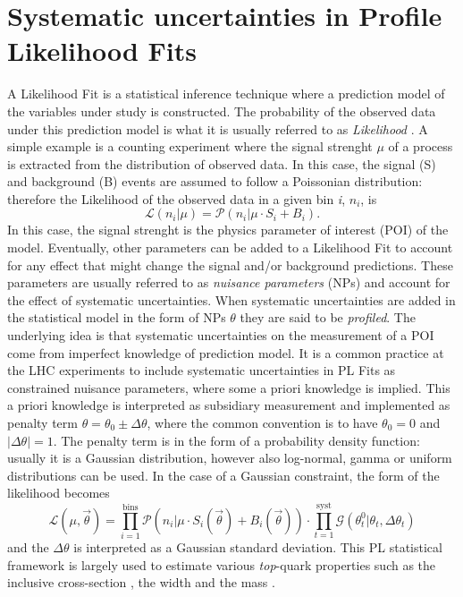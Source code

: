 \documentclass[12pt]{article}
\begin{document}
\section{Systematic uncertainties in Profile Likelihood Fits}
A Likelihood Fit is a statistical inference technique where a prediction model of the variables under study is constructed. The probability of the observed data under this prediction model is what it is usually referred to as \emph{Likelihood} \cite{kCranmer}.
A simple example is a counting experiment where the signal strenght $\mu$ of a process is extracted from the distribution of observed data. In this case, the signal (S) and background (B) events are assumed to follow a Poissonian distribution: therefore the Likelihood of the observed data in a given bin \emph{i}, $n_i$, is
\begin{equation}
\mathcal{L}(n_i|\mu) = \mathcal{P}(n_i|\mu\cdot S_i+B_i).
\end{equation}
In this case, the signal strenght is the physics parameter of interest (POI) of the model. Eventually, other parameters can be added to a Likelihood Fit to account for any effect that might change the signal and/or background predictions. 
These parameters are usually referred to as \emph{nuisance parameters} (NPs) and account for the effect of systematic uncertainties. When systematic uncertainties are added in the statistical model in the form of NPs $\theta$ they are said to be \emph{profiled}. The underlying idea is that systematic uncertainties on the measurement of a POI come from imperfect knowledge of prediction model. It is a common practice at the LHC experiments to include systematic uncertainties in PL Fits as constrained nuisance parameters, where some a priori knowledge is implied. This a priori knowledge is interpreted as subsidiary measurement and implemented as penalty term $\theta = \theta_0\pm\Delta\theta$, where the common convention is to have $\theta_0 = 0$ and $|\Delta\theta| =1$. The penalty term is in the form of a probability density function: usually it is a Gaussian distribution, however also log-normal, gamma or uniform distributions can be used. 
In the case of a Gaussian constraint, the form of the likelihood becomes 
\begin{equation}
\mathcal{L}(\mu,\vec{\theta}) = \displaystyle\prod_{i=1}^{\mathrm{bins}}\mathcal{P}(n_i|\mu\cdot S_i(\vec{\theta})+B_i(\vec{\theta}))\cdot\displaystyle\prod_{t=1}^{\mathrm{syst}}\mathcal{G}(\theta_t^0|\theta_t,\Delta\theta_t)
\end{equation}
and the $\Delta\theta$ is interpreted as a Gaussian standard deviation.
This PL statistical framework is largely used to estimate various \emph{top}-quark properties such as the inclusive cross-section \cite{Aad_2020,CMS_inclusive}, the width \cite{ATLAS:2019onj} and the mass \cite{CMS_inclusive}.
\end{document}
